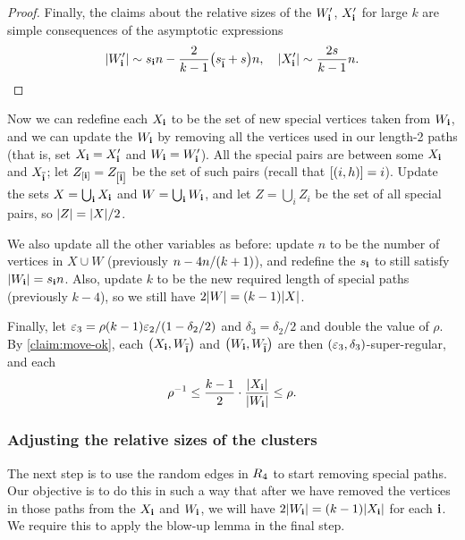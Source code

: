\documentclass[11pt,english]{article}
\theoremstyle{plain}
\theoremstyle{plain}
\theoremstyle{plain}
\theoremstyle{plain}
\theoremstyle{plain}
\theoremstyle{definition}
\theoremstyle{definition}
\theoremstyle{remark}
\theoremstyle{remark}
\theoremstyle{plain}
\theoremstyle{definition}
\theoremstyle{definition}
\theoremstyle{plain}
\theoremstyle{plain}
\theoremstyle{plain}
\theoremstyle{plain}
\theoremstyle{remark}
\theoremstyle{plain}
\theoremstyle{definition}
\let\originalleft\left
\let\originalright\right
\renewcommand{\left}{\mathopen{}\mathclose\bgroup\originalleft}
\renewcommand{\right}{\aftergroup\egroup\originalright}
\begin{document}
\begin{proof}
Finally, the claims about the relative sizes of the $W_{\mathbf{i}}'$, $X_{\mathbf{i}}'$
for large $k$ are simple consequences of the asymptotic expressions
\[
\left|W_{\bi}'\right|\sim s_{\bi}n-\frac{2}{k-1}\left(s_{\flip{\bi}}+s\right)n,\quad\left|X_{\bi}'\right|\sim\frac{2s}{k-1}n.\qedhere
\]

\end{proof}
Now we can redefine each $X_{\mathbf{i}}$ to be the set of new special vertices
taken from $W_{\mathbf{i}}$, and we can update the $W_{\mathbf{i}}$ by removing
all the vertices used in our length-2 paths (that is, set $X_{\mathbf{i}}=X_{\mathbf{i}}'$
and $W_{\mathbf{i}}=W_{\mathbf{i}}'$). All the special pairs are between some $X_{\mathbf{i}}$
and $X_{\overline{\mathbf{i}}}$; let $Z_{\left[\bi\right]}=Z_{\left[\flip{\bi}\right]}$
be the set of such pairs (recall that $\left[\left(i,\h\right)\right]=i$).
Update the sets $X=\bigcup_{\mathbf{i}}X_{\mathbf{i}}$ and $W=\bigcup_{\mathbf{i}}W_{\mathbf{i}}$,
and let $Z=\bigcup_{i}Z_{i}$ be the set of all special pairs, so
$\left|Z\right|=\left|X\right|/2$.

We also update all the other variables as before: update $n$ to be
the number of vertices in $X\cup W$ (previously $n-4n/\left(k+1\right)$),
and redefine the $s_{\mathbf{i}}$ to still satisfy $\left|W_{\bi}\right|=s_{\bi}n$.
Also, update $k$ to be the new required length of special paths (previously
$k-4$), so we still have $2\left|W\right|=\left(k-1\right)\left|X\right|$.

Finally, let $\varepsilon_{3}=\rho\left(k-1\right)\varepsilon_{2}/\left(1-\delta_{2}/2\right)$
and $\delta_{3}=\delta_{2}/2$ and double the value of $\rho$. By
\ref{claim:move-ok}, each $\left(X_{\bi},W_{\flip{\bi}}\right)$
and $\left(W_{\bi},W_{\flip{\bi}}\right)$ are then $\left(\varepsilon_{3},\delta_{3}\right)$-super-regular,
and each 
\[
\rho^{-1}\le\frac{k-1}{2}\cdot\frac{\left|X_{\bi}\right|}{\left|W_{\bi}\right|}\le\rho.
\]



\subsubsection{Adjusting the relative sizes of the clusters\label{sub:cluster-adjustment}}

The next step is to use the random edges in $R_{4}$ to start removing
special paths. Our objective is to do this in such a way that after
we have removed the vertices in those paths from the $X_{\mathbf{i}}$ and
$W_{\mathbf{i}}$,  we will have $2\left|W_{\bi}\right|=\left(k-1\right)\left|X_{\bi}\right|$
for each $\mathbf{i}$. We require this to apply the blow-up lemma in the
final step.
\end{document}

